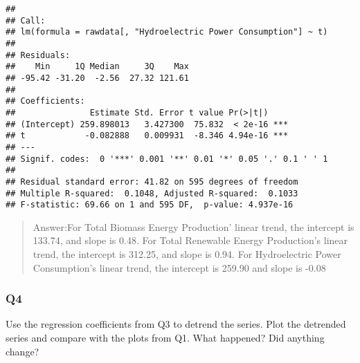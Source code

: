 \documentclass[
]{article}
\newenvironment{Shaded}{\begin{snugshade}}{\end{snugshade}}
\newcommand{\AttributeTok}[1]{\textcolor[rgb]{0.77,0.63,0.00}{#1}}
\newcommand{\CommentTok}[1]{\textcolor[rgb]{0.56,0.35,0.01}{\textit{#1}}}
\newcommand{\FunctionTok}[1]{\textcolor[rgb]{0.00,0.00,0.00}{#1}}
\newcommand{\NormalTok}[1]{#1}
\newcommand{\OtherTok}[1]{\textcolor[rgb]{0.56,0.35,0.01}{#1}}
\newcommand{\SpecialCharTok}[1]{\textcolor[rgb]{0.00,0.00,0.00}{#1}}
\newcommand{\StringTok}[1]{\textcolor[rgb]{0.31,0.60,0.02}{#1}}
\begin{document}
\begin{verbatim}
## 
## Call:
## lm(formula = rawdata[, "Hydroelectric Power Consumption"] ~ t)
## 
## Residuals:
##    Min     1Q Median     3Q    Max 
## -95.42 -31.20  -2.56  27.32 121.61 
## 
## Coefficients:
##               Estimate Std. Error t value Pr(>|t|)    
## (Intercept) 259.898013   3.427300  75.832  < 2e-16 ***
## t            -0.082888   0.009931  -8.346 4.94e-16 ***
## ---
## Signif. codes:  0 '***' 0.001 '**' 0.01 '*' 0.05 '.' 0.1 ' ' 1
## 
## Residual standard error: 41.82 on 595 degrees of freedom
## Multiple R-squared:  0.1048, Adjusted R-squared:  0.1033 
## F-statistic: 69.66 on 1 and 595 DF,  p-value: 4.937e-16
\end{verbatim}

\begin{quote}
Answer:For Total Biomass Energy Production' linear trend, the intercept
is 133.74, and slope is 0.48. For Total Renewable Energy Production's
linear trend, the intercept is 312.25, and slope is 0.94. For
Hydroelectric Power Consumption's linear trend, the intercept is 259.90
and slope is -0.08
\end{quote}

\hypertarget{q4}{%
\subsubsection{Q4}\label{q4}}

Use the regression coefficients from Q3 to detrend the series. Plot the
detrended series and compare with the plots from Q1. What happened? Did
anything change?

\begin{Shaded}
\end{Shaded}
\end{document}
